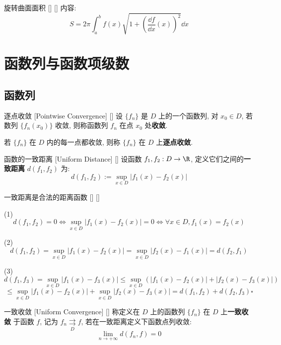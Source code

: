 \documentclass[UTF8]{ctexart}
\begin{document}
			\begin{thm}
			    []
			    {旋转曲面面积}
			    []
			    []
				内容: 
				\[S=2\pi\int_a^b f(x)\sqrt{1+\left(\frac{\dd f}{\dd x}(x)\right)^2}\dd x\]
			\end{thm}

	\section{函数列与函数项级数}

		\subsection{函数列}

			\begin{dfn}
			    []
			    {逐点收敛 }
			    [Pointwise Convergence]
			    []
				设 \(\{f_n\}\) 是 \(D\) 上的一个函数列, 对 \(x_0\in D\), 若数列 \(\{f_n(x_0)\}\) 收敛, 则称函数列 \(f_n\) 在点 \(x_0\) 处\textbf{收敛}. 
				
				若 \(\{f_n\}\) 在 \(D\) 内的每一点都收敛, 则称 \(\{f_n\}\) 在 \(D\) 上\textbf{逐点收敛}. 
			\end{dfn}

			\begin{dfn}
			    []
			    {函数的一致距离 }
			    [Uniform Distance]
			    []
				设函数 \(f_1,f_2:D\to\R\), 定义它们之间的\textbf{一致距离} \(d(f_1,f_2)\) 为: 
				\[d(f_1,f_2):=\sup_{x\in D}|f_1(x)-f_2(x)|\]
			\end{dfn}

			\begin{ppt}
			    []
			    {一致距离是合法的距离函数}
			    []
			    []
			\end{ppt}

			\begin{prf}
				(1) \[d(f_1,f_2)=0\iff\sup_{x\in D}|f_1(x)-f_2(x)|=0\iff\forall x\in D, f_1(x)=f_2(x)\]

				(2) \[d(f_1,f_2)=\sup_{x\in D}|f_1(x)-f_2(x)|=\sup_{x\in D}|f_2(x)-f_1(x)|=d(f_2,f_1)\]

				(3) \[d(f_1,f_3)=\sup_{x\in D}|f_1(x)-f_3(x)|\leq\sup_{x\in D}(|f_1(x)-f_2(x)|+|f_2(x)-f_3(x)|)\]
				\[\leq\sup_{x\in D}|f_1(x)-f_2(x)|+\sup_{x\in D}|f_2(x)-f_3(x)|=d(f_1,f_2)+d(f_2,f_3)\square\]
			\end{prf}

			\begin{dfn}
			    []
			    {一致收敛 }
			    [Uniform Convergence]
			    []
				称定义在 \(D\) 上的函数列 \(\{f_n\}\) 在 \(D\) 上\textbf{一致收敛} 于函数 \(f\), 记为 \(f_n\underset{D}{\rightrightarrows} f\), 若在一致距离定义下函数点列收敛: 
				\[\lim_{n\to+\infty}d(f_n,f)=0\]
			\end{dfn}
\end{document}
